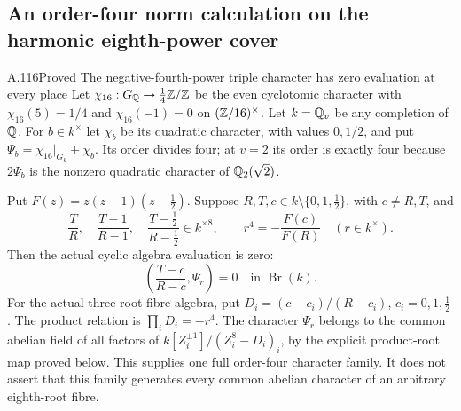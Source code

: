 \subsection{An order-four norm calculation on the harmonic eighth-power cover}

\begin{statement}{A.116}{Proved}
{The negative-fourth-power triple character has zero evaluation at every place}
Let $\chi_{16}:G_{\mathbb Q}\to\tfrac14\mathbb Z/\mathbb Z$ be the even
cyclotomic character with $\chi_{16}(5)=1/4$ and
$\chi_{16}(-1)=0$ on $(\mathbb Z/16)^\times$.
Let $k=\mathbb Q_v$ be any completion of $\mathbb Q$.
For $b\in k^\times$ let $\chi_b$ be its quadratic
character, with values $0,1/2$, and put
$\Psi_b=\chi_{16}|_{G_k}+\chi_b$.
Its order divides four; at $v=2$ its order is exactly
four because $2\Psi_b$ is the nonzero quadratic
character of $\mathbb Q_2(\sqrt2)$.

Put $F(z)=z(z-1)(z-\tfrac12)$.
Suppose $R,T,c\in k\setminus\{0,1,\tfrac12\}$,
with $c\ne R,T$, and
\[
 \frac TR,\quad\frac{T-1}{R-1},\quad
 \frac{T-\tfrac12}{R-\tfrac12}\in k^{\times8},
 \qquad
                     r^4=-\frac{F(c)}{F(R)}
                       \quad(r\in k^\times).
\tag{A.116.1}
\]
Then the actual cyclic algebra evaluation is zero:
\[
                   \left(\frac{T-c}{R-c},\Psi_r\right)=0
                                    \quad\text{in }\operatorname{Br}(k).
\tag{A.116.2}
\]
For the actual three-root fibre algebra, put
$D_i=(c-c_i)/(R-c_i)$, $c_i=0,1,\tfrac12$.
The product relation is $\prod_iD_i=-r^4$.
The character $\Psi_r$ belongs to the common
abelian field of all factors of
$k[Z_i^{\pm1}]/(Z_i^8-D_i)_i$, by the explicit
product-root map proved below.
This supplies one full order-four character family.
It does not assert that this family generates every
common abelian character of an arbitrary eighth-root fibre.
\end{statement}

